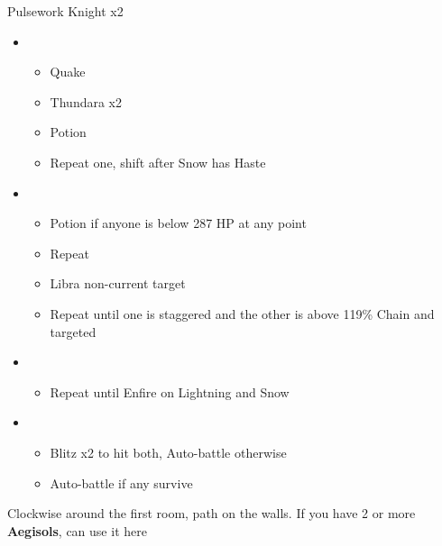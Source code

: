 \begin{battle}{Pulsework Knight x2}
\begin{itemize}
    \item \first
    \begin{itemize}
        \item Quake
        \item Thundara x2
        \item Potion
	\item Repeat one, shift after Snow has Haste
    \end{itemize}
    \item \second
    \begin{itemize}
	\item Potion if anyone is below 287 HP at any point
        \item Repeat
        \item Libra non-current target
        \item Repeat until one is staggered and the other is above 119\% Chain and targeted
    \end{itemize}
    \item \fifth
    \begin{itemize}
        \item Repeat until Enfire on Lightning and Snow
    \end{itemize}
    \item \sixth
    \begin{itemize}
        \item Blitz x2 to hit both, Auto-battle otherwise
        \item Auto-battle if any survive
    \end{itemize}
\end{itemize}
\end{battle}
Clockwise around the first room, path on the walls.
\newpage
If you have 2 or more \textbf{Aegisols}, can use it here
